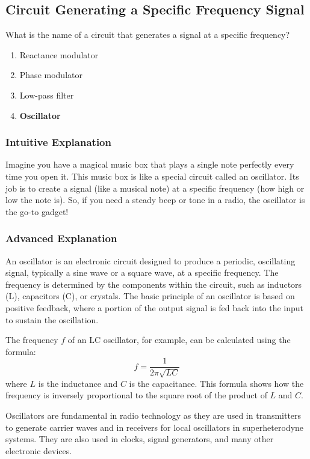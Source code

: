 \subsection{Circuit Generating a Specific Frequency Signal}
\label{T7A05}

\begin{tcolorbox}[colback=gray!10!white,colframe=black!75!black,title=T7A05]
What is the name of a circuit that generates a signal at a specific frequency?
\begin{enumerate}[label=\Alph*)]
    \item Reactance modulator
    \item Phase modulator
    \item Low-pass filter
    \item \textbf{Oscillator}
\end{enumerate}
\end{tcolorbox}

\subsubsection{Intuitive Explanation}
Imagine you have a magical music box that plays a single note perfectly every time you open it. This music box is like a special circuit called an oscillator. Its job is to create a signal (like a musical note) at a specific frequency (how high or low the note is). So, if you need a steady beep or tone in a radio, the oscillator is the go-to gadget!

\subsubsection{Advanced Explanation}
An oscillator is an electronic circuit designed to produce a periodic, oscillating signal, typically a sine wave or a square wave, at a specific frequency. The frequency is determined by the components within the circuit, such as inductors (L), capacitors (C), or crystals. The basic principle of an oscillator is based on positive feedback, where a portion of the output signal is fed back into the input to sustain the oscillation.

The frequency \( f \) of an LC oscillator, for example, can be calculated using the formula:
\[
f = \frac{1}{2\pi\sqrt{LC}}
\]
where \( L \) is the inductance and \( C \) is the capacitance. This formula shows how the frequency is inversely proportional to the square root of the product of \( L \) and \( C \).

Oscillators are fundamental in radio technology as they are used in transmitters to generate carrier waves and in receivers for local oscillators in superheterodyne systems. They are also used in clocks, signal generators, and many other electronic devices.


